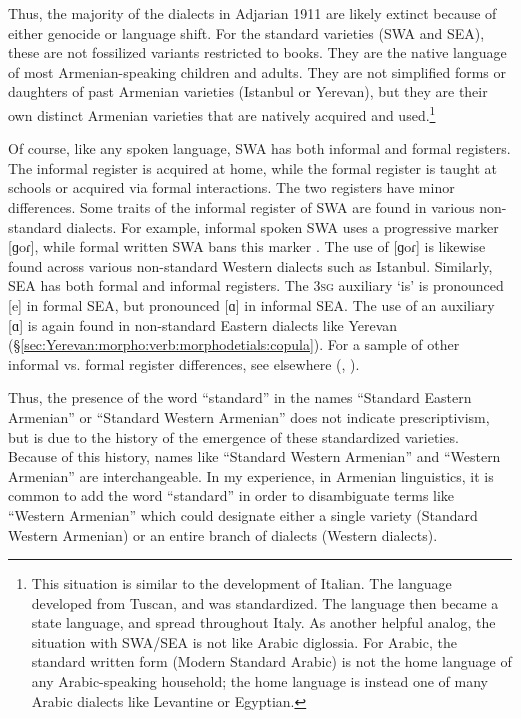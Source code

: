 \documentclass[output=paper]{langscibook}
\begin{document}
Thus, the majority of the dialects in Adjarian 1911 are likely extinct  because of either genocide or language shift. For the standard varieties (SWA and SEA), these are not fossilized variants restricted to books. They are the native language of most Armenian\hyp speaking children and adults. They are not simplified forms or daughters of past Armenian varieties (Istanbul or Yerevan), but they are their own distinct Armenian varieties that are natively acquired and used.\footnote{This situation is similar to the development of Italian. The language developed from Tuscan, and was standardized. The language then became a state language, and spread throughout Italy. As another helpful analog, the situation with SWA/SEA is not like Arabic diglossia. For Arabic, the standard written form (Modern Standard Arabic) is not the home language of any Arabic-speaking household; the home language is instead one of many Arabic dialects like Levantine or Egyptian.}





Of course, like any spoken language, SWA has both informal and formal registers. The informal register is acquired at home, while the formal register is taught at schools or acquired via formal interactions. The two registers have minor differences. Some traits of the informal register of SWA are found in various non-standard dialects. For example, informal spoken SWA uses a progressive marker [ɡoɾ], while formal written SWA bans this marker \citep{donabedian-2001-tabouLinguisticArmenianOccidentalGorProgressive}. The use of [ɡoɾ] is likewise found across various non-standard Western dialects such as Istanbul. Similarly, SEA has both formal and informal registers. The 3\textsc{sg} auxiliary `is' is pronounced [e] in formal SEA, but pronounced [ɑ] in informal SEA. The use of an auxiliary [ɑ] is again found in non-standard Eastern dialects like Yerevan (\S\ref{sec:Yerevan:morpho:verb:morphodetials:copula}). For a sample of other informal vs. formal register differences, see elsewhere (\citealt{Gharagyulyan-1981-ColloquialArmenian,Zakaryan-1981-ColloquialArmenian,Aghayan-1981-ColloquialArmenian,Kavassian-1983-CertainProblemMorphologyArmenianMontreal,DumTragut-2009-ArmenianReferenceGrammar}, \citealt[ch3]{Karapetian-2014-TeachArmenianEasternArmenianHeritage}).


Thus, the presence of the word “standard” in the names “Standard Eastern Armenian” or “Standard Western Armenian” does not indicate prescriptivism, but is due to the history of the emergence of these standardized varieties. Because of this history, names like “Standard Western Armenian” and “Western Armenian” are interchangeable. In my experience, in Armenian linguistics, it is common to add the word “standard” in order to disambiguate terms like ``Western Armenian'' which could designate either a single variety (Standard Western Armenian) or an entire branch of dialects (Western dialects).
\end{document}
